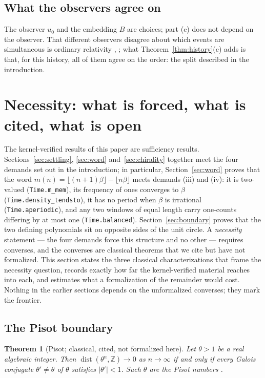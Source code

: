 \documentclass[11pt]{amsart}
\theoremstyle{plain}
\newtheorem{theorem}{Theorem}[section]
\theoremstyle{definition}
\theoremstyle{remark}
\begin{document}
\subsection{What the observers agree on}

The observer $u_0$ and the embedding $B$ are choices; part (c) does not depend on the
observer. That different observers disagree about which events are simultaneous is ordinary
relativity \cite{zeeman1964}, \cite[Ch.~6]{hawkingellis1973}; what
Theorem~\ref{thm:history}(c) adds is that, for this history, all of them agree on the order:
the split described in the introduction.

\section{Necessity: what is forced, what is cited, what is open}
\label{sec:frontier}

The kernel-verified results of this paper are sufficiency results. Sections~\ref{sec:settling}, \ref{sec:word} and~\ref{sec:chirality} together meet the four demands set out in the introduction; in particular, Section~\ref{sec:word} proves that the word $m(n) = \lfloor (n+1)\beta \rfloor - \lfloor n\beta \rfloor$ meets demands (iii) and (iv): it is two-valued (\texttt{Time.m\_mem}), its frequency of ones converges to $\beta$ (\texttt{Time.density\_tendsto}), it has no period when $\beta$ is irrational (\texttt{Time.aperiodic}), and any two windows of equal length carry one-counts differing by at most one (\texttt{Time.balanced}). Section~\ref{sec:boundary} proves that the two defining polynomials sit on opposite sides of the unit circle. A \emph{necessity} statement --- the four demands force this structure and no other --- requires converses, and the converses are classical theorems that we cite but have not formalized. This section states the three classical characterizations that frame the necessity question, records exactly how far the kernel-verified material reaches into each, and estimates what a formalization of the remainder would cost. Nothing in the earlier sections depends on the unformalized converses; they mark the frontier.

\subsection{The Pisot boundary}

\begin{theorem}[Pisot; classical, cited, not formalized here]
\label{thm:pisot}
Let $\theta > 1$ be a real algebraic integer. Then $\operatorname{dist}(\theta^n, \mathbb{Z}) \to 0$ as $n \to \infty$ if and only if every Galois conjugate $\theta' \neq \theta$ of $\theta$ satisfies $|\theta'| < 1$. Such $\theta$ are the Pisot numbers \cite{bertin1992}.
\end{theorem}
\end{document}

